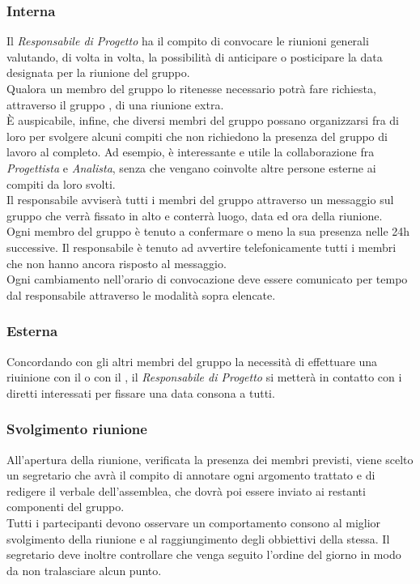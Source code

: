         \subsubsection{Interna}
          Il \emph{Responsabile di Progetto} ha il compito di convocare le riunioni generali valutando, di volta in volta, la possibilità di anticipare o posticipare la data
          designata per la riunione del gruppo.\\
          Qualora un membro del gruppo lo ritenesse necessario potrà fare richiesta, attraverso il gruppo \textbf{}, di una riunione extra.\\
          È auspicabile, infine, che diversi membri del gruppo possano organizzarsi fra di loro per svolgere alcuni compiti che non richiedono la presenza  del gruppo di lavoro
          al completo. Ad esempio, è interessante e utile la collaborazione fra \emph{Progettista} e \emph{Analista}, senza che vengano coinvolte altre persone esterne ai compiti
          da loro svolti.\\
          Il responsabile avviserà tutti i membri del gruppo attraverso un messaggio sul gruppo \textbf{} che verrà fissato in alto e conterrà luogo, data ed ora della riunione.\\
          Ogni membro del gruppo è tenuto a confermare o meno la sua presenza nelle 24h successive. Il responsabile è tenuto ad avvertire telefonicamente tutti i membri che
          non hanno ancora risposto al messaggio.\\
          Ogni cambiamento nell'orario di convocazione deve essere comunicato per tempo dal responsabile attraverso le modalità sopra elencate.
        \subsubsection{Esterna}
          Concordando con gli altri membri del gruppo la necessità di effettuare una riuinione con il  o con il , il \emph{Responsabile di Progetto}
          si metterà in contatto con i diretti interessati per fissare una data consona a tutti.
        \subsubsection{Svolgimento riunione}
          All’apertura della riunione, verificata la presenza dei membri previsti, viene scelto un segretario che avrà il compito di annotare ogni argomento trattato e di redigere il verbale
          dell’assemblea, che dovrà poi essere inviato ai restanti componenti del gruppo.\\
          Tutti i partecipanti devono osservare un comportamento consono al miglior svolgimento della riunione e al raggiungimento degli obbiettivi della stessa. Il segretario deve inoltre
          controllare che venga seguito l’ordine del giorno in modo da non tralasciare alcun punto.
